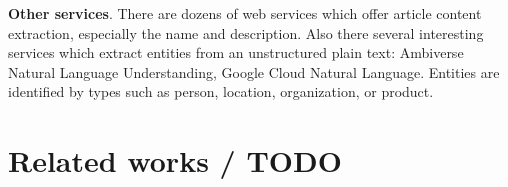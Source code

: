 \noindent\textbf{Other services}. There are dozens of web services which offer article content extraction, especially the name and description. Also there several interesting services which extract entities from an unstructured plain text: Ambiverse Natural Language Understanding, Google Cloud Natural Language. Entities are identified by types such as person, location, organization, or product.\\

\section{Related works / TODO}
